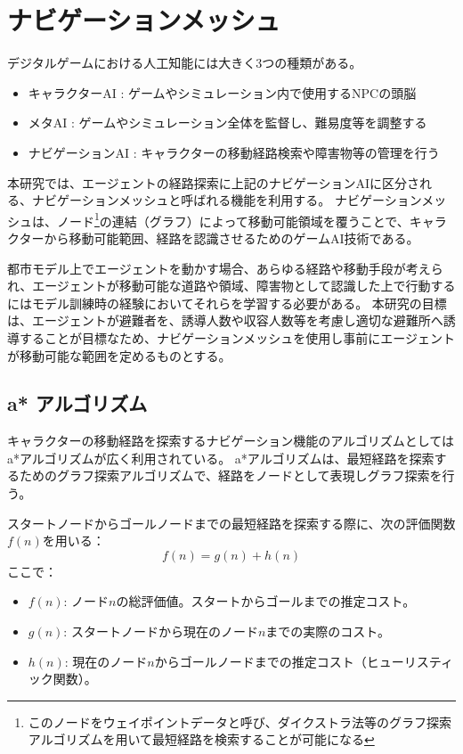 \section{ナビゲーションメッシュ}
デジタルゲームにおける人工知能\cite{miyake2016}には大きく3つの種類がある。
\begin{itemize}
  \item キャラクターAI : ゲームやシミュレーション内で使用するNPCの頭脳
  \item メタAI : ゲームやシミュレーション全体を監督し、難易度等を調整する
  \item ナビゲーションAI : キャラクターの移動経路検索や障害物等の管理を行う
\end{itemize}

本研究では、エージェントの経路探索に上記のナビゲーションAIに区分される、ナビゲーションメッシュと呼ばれる機能を利用する。
ナビゲーションメッシュは、ノード\footnote{このノードをウェイポイントデータと呼び、ダイクストラ法等のグラフ探索アルゴリズムを用いて最短経路を検索することが可能になる}の連結（グラフ）によって移動可能領域を覆うことで、キャラクターから移動可能範囲、経路を認識させるためのゲームAI技術である。\par
都市モデル上でエージェントを動かす場合、あらゆる経路や移動手段が考えられ、エージェントが移動可能な道路や領域、障害物として認識した上で行動するにはモデル訓練時の経験においてそれらを学習する必要がある。
本研究の目標は、エージェントが避難者を、誘導人数や収容人数等を考慮し適切な避難所へ誘導することが目標なため、ナビゲーションメッシュを使用し事前にエージェントが移動可能な範囲を定めるものとする。


\subsection{a* アルゴリズム}
キャラクターの移動経路を探索するナビゲーション機能のアルゴリズムとしてはa*アルゴリズムが広く利用されている。
a*アルゴリズムは、最短経路を探索するためのグラフ探索アルゴリズムで、経路をノードとして表現しグラフ探索を行う。

スタートノードからゴールノードまでの最短経路を探索する際に、次の評価関数$f(n)$を用いる：
\[
f(n) = g(n) + h(n)
\]
ここで：
\begin{itemize}
    \item $f(n)$: ノード$n$の総評価値。スタートからゴールまでの推定コスト。
    \item $g(n)$: スタートノードから現在のノード$n$までの実際のコスト。
    \item $h(n)$: 現在のノード$n$からゴールノードまでの推定コスト（ヒューリスティック関数）。
\end{itemize}

